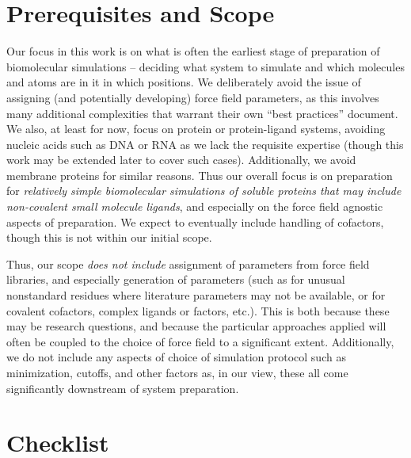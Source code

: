 \documentclass[9pt,bestpractices]{livecoms}
\begin{document}
\section{Prerequisites and Scope}
Our focus in this work is on what is often the earliest stage of preparation of biomolecular simulations -- deciding what system to simulate and which molecules and atoms are in it in which positions. 
We deliberately avoid the issue of assigning (and potentially developing) force field parameters, as this involves many additional complexities that warrant their own ``best practices'' document.
We also, at least for now, focus on protein or protein-ligand systems, avoiding nucleic acids such as DNA or RNA as we lack the requisite expertise (though this work may be extended later to cover such cases). 
Additionally, we avoid membrane proteins for similar reasons.
Thus our overall focus is on preparation for \emph{relatively simple biomolecular simulations of soluble proteins that may include non-covalent small molecule ligands}, and especially on the force field agnostic aspects of preparation.
We expect to eventually include handling of cofactors, though this is not within our initial scope.

Thus, our scope \emph{does not include} assignment of parameters from force field libraries, and especially generation of parameters (such as for unusual nonstandard residues where literature parameters may not be available, or for covalent cofactors, complex ligands or factors, etc.). 
This is both because these may be research questions, and because the particular approaches applied will often be coupled to the choice of force field to a significant extent.
Additionally, we do not include any aspects of choice of simulation protocol such as minimization, cutoffs, and other factors as, in our view, these all come significantly downstream of system preparation. 


\section{Checklist}
\end{document}
